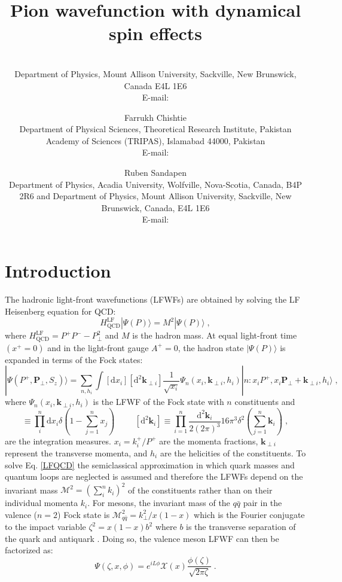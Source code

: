 \documentclass{PoS}
\title{Pion wavefunction with dynamical spin effects}
\author{\speaker{Mohammad Ahmady}%
        \\
        Department of Physics, Mount Allison University, Sackville, New Brunswick, Canada E4L 1E6\\
        E-mail: \email{mahmady@mta.ca}}
\author{Farrukh Chishtie
	\\ 
	Department of Physical Sciences,
	Theoretical Research Institute, Pakistan Academy of Sciences (TRIPAS), Islamabad 44000, Pakistan\\ 
	E-mail: \email{fchishti@uwo.ca}}
\author{Ruben Sandapen 
	\\ 
	Department of Physics, Acadia University,
	Wolfville, Nova-Scotia, Canada, B4P 2R6 and
	Department of Physics, Mount Allison University,
	Sackville, New Brunswick, Canada, E4L 1E6\\ 
	E-mail: \email{ruben.sandapen@acadiau.ca}}
\begin{document}
\section{Introduction}
 The hadronic light-front wavefunctions (LFWFs) are obtained by solving the LF Heisenberg equation for QCD: \cite{Brodsky:2014yha}
\begin{equation}
	H_{\text{QCD}}^{\text{LF}} |\Psi(P)\rangle = M^2 |\Psi(P) \rangle\;,
	\label{LFQCD} 
\end{equation} 
where $H_{\text{QCD}}^{\text{LF}}=P^+P^- -P_{\perp}^2$ and $M$ is the hadron mass. At equal light-front time $(x^+=0)$ and in the light-front gauge $A^+=0$, the hadron state $|\Psi(P)\rangle$ is expanded in terms of the Fock states:  
\begin{equation}
	|\Psi(P^+, \mathbf{P_{\perp}}, S_z) \rangle = \sum_{n,h_i} \int [\mathrm{d} x_i]  [\mathrm{d}^2 \mathbf{k}_{\perp i}] \frac{1}{\sqrt{x_i}}\Psi_{n}(x_i,\mathbf{k}_{\perp i},h_i) |n: x_i P^+, x_i \mathbf{P_{\perp}} + \mathbf{k}_{\perp i}, h_i \rangle\;,
	\label{Fock-expansion}	
\end{equation} 
where $\Psi_{n}(x_i, \mathbf{k}_{\perp i},h_i)$ is the LFWF of the  Fock state with $n$ constituents and 
\begin{equation}
	[\mathrm{d} x_i] \equiv \prod_{i}^{n} \mathrm{d} x_i \delta (1-\sum_{j=1}^{n} x_j) \hspace{1cm} [\mathrm{d}^2 \mathbf{k}_{i}]\equiv \prod_{i=1}^{n} \frac{\mathrm{d}^2 \mathbf{k}_i}{2(2\pi)^3} 16 \pi^3 \delta^2(\sum_{j=1}^n \mathbf{k}_i) \;,
	\label{Int-measures}	 
\end{equation} 
are the integration measures.  $x_i=k_i^+/P^+$ are the momenta fractions, $\mathbf{k}_{\perp i}$ represent the transverse momenta, and $h_i$ are the helicities of the constituents. To solve Eq. \eqref{LFQCD} the semiclassical approximation in which quark masses and quantum loops are neglected is assumed and therefore the LFWFs depend on the invariant mass $\mathcal{M}^2=(\sum_{i}^n k_i)^2$ of the constituents rather than on their individual momenta $k_i$. For mesons, the invariant mass of the $q\bar{q}$ pair in the valence ($n=2$) Fock state is $\mathcal{M}_{q\bar{q}}^2=k_{\perp}^2/x(1-x)$ which is the Fourier conjugate to the impact variable $\zeta^2=x(1-x) b^2$ where $b$ is the transverse separation of the quark and antiquark \cite{Brodsky:2014yha}. Doing so, the valence meson LFWF can then be factorized as: 
\begin{equation}
	\Psi(\zeta, x, \phi)= e^{iL\phi} \mathcal{X}(x) \frac{\phi (\zeta)}{\sqrt{2 \pi \zeta}} \;.
	\label{mesonwf}
\end{equation}
\end{document}
